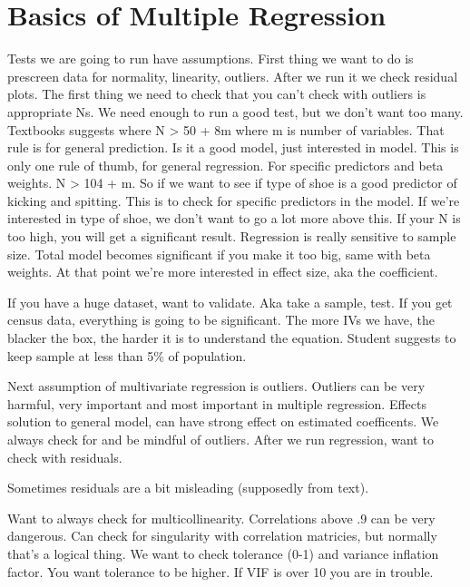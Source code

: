 \documentclass[]{book}
\theoremstyle{definition}
\theoremstyle{definition}
\theoremstyle{definition}
\theoremstyle{remark}
\begin{document}
\section{Basics of Multiple
Regression}\label{basics-of-multiple-regression}

Tests we are going to run have assumptions. First thing we want to do is
prescreen data for normality, linearity, outliers. After we run it we
check residual plots. The first thing we need to check that you can't
check with outliers is appropriate Ns. We need enough to run a good
test, but we don't want too many. Textbooks suggests where N
\textgreater{} 50 + 8m where m is number of variables. That rule is for
general prediction. Is it a good model, just interested in model. This
is only one rule of thumb, for general regression. For specific
predictors and beta weights. N \textgreater{} 104 + m. So if we want to
see if type of shoe is a good predictor of kicking and spitting. This is
to check for specific predictors in the model. If we're interested in
type of shoe, we don't want to go a lot more above this. If your N is
too high, you will get a significant result. Regression is really
sensitive to sample size. Total model becomes significant if you make it
too big, same with beta weights. At that point we're more interested in
effect size, aka the coefficient.

If you have a huge dataset, want to validate. Aka take a sample, test.
If you get census data, everything is going to be significant. The more
IVs we have, the blacker the box, the harder it is to understand the
equation. Student suggests to keep sample at less than 5\% of
population.

Next assumption of multivariate regression is outliers. Outliers can be
very harmful, very important and most important in multiple regression.
Effects solution to general model, can have strong effect on estimated
coefficents. We always check for and be mindful of outliers. After we
run regression, want to check with residuals.

Sometimes residuals are a bit misleading (supposedly from text).

Want to always check for multicollinearity. Correlations above .9 can be
very dangerous. Can check for singularity with correlation matricies,
but normally that's a logical thing. We want to check tolerance (0-1)
and variance inflation factor. You want tolerance to be higher. If VIF
is over 10 you are in trouble.
\end{document}
